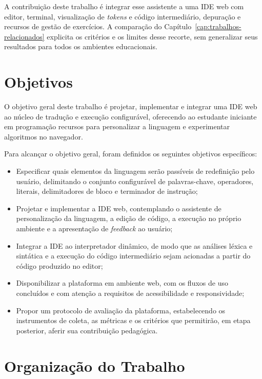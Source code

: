 A contribuição deste trabalho é integrar esse assistente a uma IDE web com editor, terminal, visualização de \textit{tokens} e código intermediário, depuração e recursos de gestão de exercícios. A comparação do Capítulo~\ref{cap:trabalhos-relacionados} explicita os critérios e os limites desse recorte, sem generalizar seus resultados para todos os ambientes educacionais.

\section{Objetivos}

O objetivo geral deste trabalho é projetar, implementar e integrar uma IDE web ao núcleo de tradução e execução configurável, oferecendo ao estudante iniciante em programação recursos para personalizar a linguagem e experimentar algoritmos no navegador.

Para alcançar o objetivo geral, foram definidos os seguintes objetivos específicos:

\begin{itemize}
    \item Especificar quais elementos da linguagem serão passíveis de redefinição pelo usuário, delimitando o conjunto configurável de palavras-chave, operadores, literais, delimitadores de bloco e terminador de instrução;
    \item Projetar e implementar a IDE web, contemplando o assistente de personalização da linguagem, a edição de código, a execução no próprio ambiente e a apresentação de \textit{feedback} ao usuário;
    \item Integrar a IDE ao interpretador dinâmico, de modo que as análises léxica e sintática e a execução do código intermediário sejam acionadas a partir do código produzido no editor;
    \item Disponibilizar a plataforma em ambiente web, com os fluxos de uso concluídos e com atenção a requisitos de acessibilidade e responsividade;
    \item Propor um protocolo de avaliação da plataforma, estabelecendo os instrumentos de coleta, as métricas e os critérios que permitirão, em etapa posterior, aferir sua contribuição pedagógica.
\end{itemize}

\section{Organização do Trabalho}

